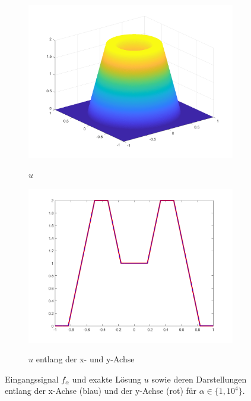 \begin{figure}[p]
  \begin{subfigure}[b]{.48\linewidth}
    \centering
    \caption{$u$}
    \includegraphics[trim = 40 30 30 30, clip, width=\linewidth]
      {pictures/chapExperiments/secGeneralInfo/f01Plots/exactSolution.png}
    \label{fig:f01ExactSol}
  \end{subfigure}
  \quad
  \begin{subfigure}[b]{.48\linewidth}
    \centering
    \caption{$u$ entlang der x- und y-Achse}
    \includegraphics[trim = 50 30 50 20, clip, width=\linewidth]
      {pictures/chapExperiments/secGeneralInfo/f01Plots/exactSolutionAxis.png}
    \label{fig:f01ExactSolAxis}
  \end{subfigure} 
  \caption{Eingangssignal $f_\alpha$ und exakte Lösung $u$ sowie deren
  Darstellungen entlang der x-Achse (blau) und der y-Achse (rot) für
  $\alpha\in\{1,10^4\}$.}
  \label{fig:f01Plots}
\end{figure}
